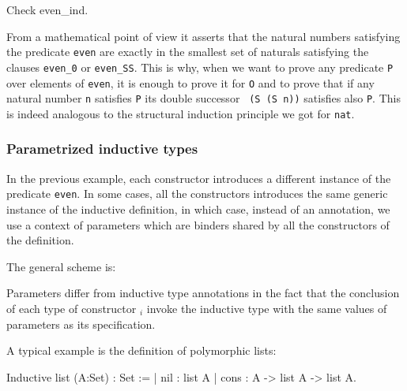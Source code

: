 \begin{coq_example}
Check even_ind.
\end{coq_example}

From a mathematical point of view it asserts that the natural numbers
satisfying the predicate {\tt even} are exactly in the smallest set of
naturals satisfying the clauses {\tt even\_0} or {\tt even\_SS}. This
is why, when we want to prove any predicate {\tt P} over elements of
{\tt even}, it is enough to prove it for {\tt O} and to prove that if
any natural number {\tt n} satisfies {\tt P} its double successor {\tt
  (S (S n))} satisfies also {\tt P}. This is indeed analogous to the
structural induction principle we got for {\tt nat}.

\begin{ErrMsgs}
\item {}
\item {}
\end{ErrMsgs}

\subsubsection{Parametrized inductive types}
In the previous example, each constructor introduces a
different instance of the predicate {\tt even}. In some cases, 
all the constructors introduces the same generic instance of the
inductive definition, in which case, instead of an annotation, we use
a context of parameters which are binders shared by all the
constructors of the definition.


The general scheme is:
\begin{center}
\end{center}
Parameters differ from inductive type annotations in the fact that the
conclusion of each type of constructor {\term$_i$} invoke the inductive
type with the same values of parameters as its specification.



A typical example is the definition of polymorphic lists:
\begin{coq_example*}
Inductive list (A:Set) : Set :=
  | nil : list A
  | cons : A -> list A -> list A.
\end{coq_example*}

